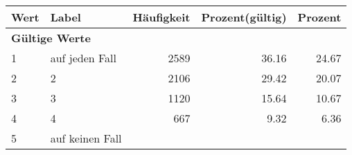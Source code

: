      \begin{longtable}{lXrrr}
     \toprule
     \textbf{Wert} & \textbf{Label} & \textbf{Häufigkeit} & \textbf{Prozent(gültig)} & \textbf{Prozent} \\
     \endhead
     \midrule
     \multicolumn{5}{l}{\textbf{Gültige Werte}}\\

     1 &
     \multicolumn{1}{X}{ auf jeden Fall   } &


       \num{2589} &
       \num[round-mode=places,round-precision=2]{36.16} &
         \num[round-mode=places,round-precision=2]{24.67} \\

     2 &
     \multicolumn{1}{X}{ 2   } &


       \num{2106} &
       \num[round-mode=places,round-precision=2]{29.42} &
         \num[round-mode=places,round-precision=2]{20.07} \\

     3 &
     \multicolumn{1}{X}{ 3   } &


       \num{1120} &
       \num[round-mode=places,round-precision=2]{15.64} &
         \num[round-mode=places,round-precision=2]{10.67} \\

     4 &
     \multicolumn{1}{X}{ 4   } &


       \num{667} &
       \num[round-mode=places,round-precision=2]{9.32} &
         \num[round-mode=places,round-precision=2]{6.36} \\

     5 &
     \multicolumn{1}{X}{ auf keinen Fall   } &



\end{longtable}
